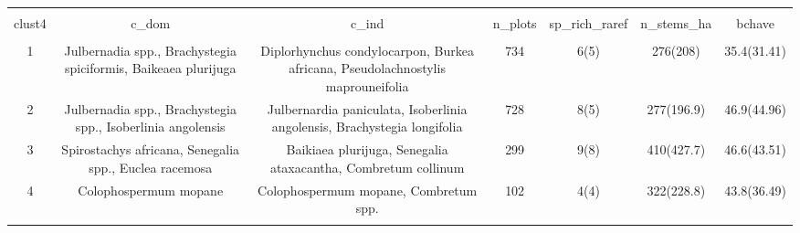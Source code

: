 
\begin{table}[!htbp] \centering 
  \caption{} 
  \label{clust_summ} 
\begin{tabular}{@{\extracolsep{5pt}} ccccccc} 
\\[-1.8ex]\hline 
\hline \\[-1.8ex] 
clust4 & c\_dom & c\_ind & n\_plots & sp\_rich\_raref & n\_stems\_ha & bchave \\ 
\hline \\[-1.8ex] 
1 & Julbernadia spp., Brachystegia spiciformis, Baikeaea plurijuga & Diplorhynchus condylocarpon, Burkea africana, Pseudolachnostylis maprouneifolia & 734 & 6(5) & 276(208) & 35.4(31.41) \\ 
2 & Julbernadia spp., Brachystegia spp., Isoberlinia angolensis & Julbernardia paniculata, Isoberlinia angolensis, Brachystegia longifolia & 728 & 8(5) & 277(196.9) & 46.9(44.96) \\ 
3 & Spirostachys africana, Senegalia spp., Euclea racemosa & Baikiaea plurijuga, Senegalia ataxacantha, Combretum collinum & 299 & 9(8) & 410(427.7) & 46.6(43.51) \\ 
4 & Colophospermum mopane & Colophospermum mopane, Combretum spp. & 102 & 4(4) & 322(228.8) & 43.8(36.49) \\ 
\hline \\[-1.8ex] 
\end{tabular} 
\end{table} 
